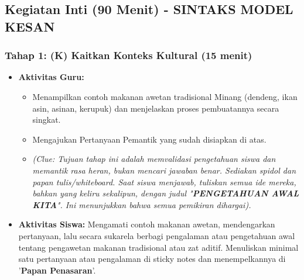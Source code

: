 \documentclass[a4paper,12pt]{article}
\begin{document}
\subsection{Kegiatan Inti (90 Menit) - SINTAKS MODEL KESAN}

\subsubsection{Tahap 1: (K) Kaitkan Konteks Kultural (15 menit)}
\begin{itemize}
\item \textbf{Aktivitas Guru:}
    \begin{itemize}
    \item Menampilkan contoh makanan awetan tradisional Minang (dendeng, ikan asin, asinan, kerupuk) dan menjelaskan proses pembuatannya secara singkat.
    \item Mengajukan Pertanyaan Pemantik yang sudah disiapkan di atas.
    \item \textit{(Clue: Tujuan tahap ini adalah memvalidasi pengetahuan siswa dan memantik rasa heran, bukan mencari jawaban benar. Sediakan spidol dan papan tulis/whiteboard. Saat siswa menjawab, tuliskan semua ide mereka, bahkan yang keliru sekalipun, dengan judul "\textbf{PENGETAHUAN AWAL KITA}". Ini menunjukkan bahwa semua pemikiran dihargai).}
    \end{itemize}
\item \textbf{Aktivitas Siswa:} Mengamati contoh makanan awetan, mendengarkan pertanyaan, lalu secara sukarela berbagi pengalaman atau pengetahuan awal tentang pengawetan makanan tradisional atau zat aditif. Menuliskan minimal satu pertanyaan atau pengalaman di sticky notes dan menempelkannya di '\textbf{Papan Penasaran}'.
\end{itemize}
\end{document}
